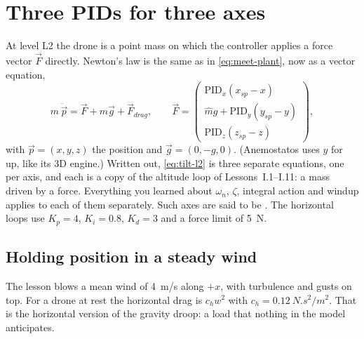 \label{les:tilt}


\section{Three PIDs for three axes}

At level L2 the drone is a point mass on which the controller applies a force vector $\vec F$ directly. Newton's law is the same as in \cref{eq:meet-plant}, now as a vector equation,
\begin{equation}\label{eq:tilt-l2}
  m\,\ddot{\vec p} = \vec F + m\vec g + \vec F_{drag} ,\qquad
  \vec F = \begin{pmatrix} \mathrm{PID}_x(x_{sp} - x)\\ \hat m g + \mathrm{PID}_y(y_{sp} - y)\\ \mathrm{PID}_z(z_{sp} - z)\end{pmatrix},
\end{equation}
with $\vec p = (x, y, z)$ the position and $\vec g = (0, -g, 0)$. (Anemostatos uses $y$ for up, like its 3D engine.) Written out, \cref{eq:tilt-l2} is three separate equations, one per axis, and each is a copy of the altitude loop of Lessons~I.1–I.11: a mass driven by a force. Everything you learned about $\omega_n$, $\zeta$, integral action and windup applies to each of them separately. Such axes are said to be . The horizontal loops use $K_p = 4$, $K_i = 0.8$, $K_d = 3$ and a force limit of \SI{5}{N}.

\subsection{Holding position in a steady wind}
The lesson blows a mean wind of \SI{4}{m/s} along $+x$, with turbulence and gusts on top. For a drone at rest the horizontal drag is $c_h w^2$ with $c_h = \SI{0.12}{N.s^2/m^2}$. That is the horizontal version of the gravity droop: a load that nothing in the model anticipates.

